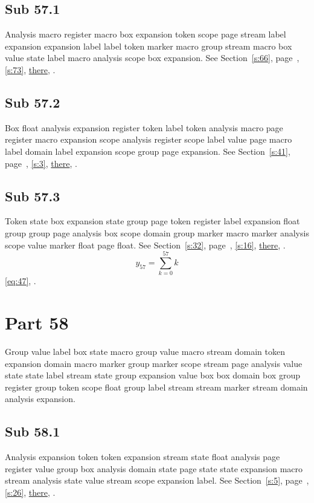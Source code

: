 \documentclass[11pt]{article}
\begin{document}
\subsection{Sub 57.1}\label{ss:57.1} Analysis macro register macro box expansion token scope page stream label expansion expansion label label token marker macro group stream macro box value state label macro analysis scope box expansion. See Section~\ref{s:66}, page~\pageref{ss:60.2}, \cref{s:73}, \hyperref[s:85]{there}, \cite{k83,k78}.
\subsection{Sub 57.2}\label{ss:57.2} Box float analysis expansion register token label token analysis macro page register macro expansion scope analysis register scope label value page macro label domain label expansion scope group page expansion. See Section~\ref{s:41}, page~\pageref{ss:84.2}, \cref{s:3}, \hyperref[s:74]{there}, \cite{k23,k90}.
\subsection{Sub 57.3}\label{ss:57.3} Token state box expansion state group page token register label expansion float group group page analysis box scope domain group marker macro marker analysis scope value marker float page float. See Section~\ref{s:32}, page~\pageref{ss:58.3}, \cref{s:16}, \hyperref[s:22]{there}, \cite{k15,k2}.
\begin{equation}y_{57}=\sum_{k=0}^{57}k\label{eq:57}\end{equation} \eqref{eq:47}, .
\section{Part 58}\label{s:58}
Group value label box state macro group value macro stream domain token expansion domain macro marker group marker scope stream page analysis value state state label stream state group expansion value box box domain box group register group token scope float group label stream stream marker stream domain analysis expansion.
\subsection{Sub 58.1}\label{ss:58.1} Analysis expansion token token expansion stream state float analysis page register value group box analysis domain state page state state expansion macro stream analysis state value stream scope expansion label. See Section~\ref{s:5}, page~\pageref{ss:95.1}, \cref{s:26}, \hyperref[s:21]{there}, \cite{k89,k36}.
\end{document}
